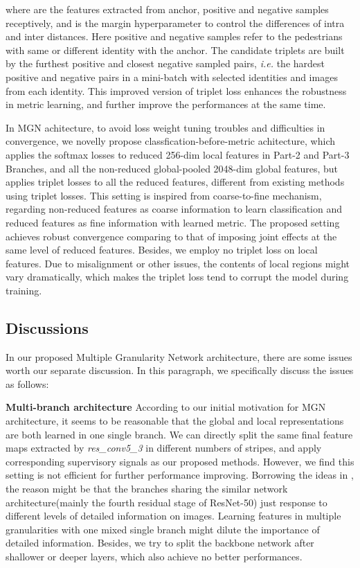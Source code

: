 \documentclass[sigconf]{acmart}
\begin{document}
where  are the features extracted from anchor, positive and negative samples receptively, and  is the margin hyperparameter to control the differences of intra and inter distances. Here positive and negative samples refer to the pedestrians with same or different identity with the anchor. The candidate triplets are built by the furthest positive and closest negative sampled pairs, \textit{i.e.} the hardest positive and negative pairs in a mini-batch with  selected identities and  images from each identity. This improved version of triplet loss enhances the robustness in metric learning, and further improve the performances at the same time.  

In MGN achitecture, to avoid loss weight tuning troubles and difficulties in convergence, we novelly propose classfication-before-metric achitecture, which applies the softmax losses to reduced 256-dim local features in Part-2 and Part-3 Branches, and all the non-reduced global-pooled 2048-dim global features, but applies triplet losses to all the reduced features, different from existing methods using triplet losses. This setting is inspired from coarse-to-fine mechanism, regarding non-reduced features as coarse information to learn classification and reduced features as fine information with learned metric. The proposed setting achieves robust convergence comparing to that of imposing joint effects at the same level of reduced features. Besides, we employ no triplet loss on local features. Due to misalignment or other issues, the contents of local regions might vary dramatically, which makes the triplet loss tend to corrupt the model during training.  


\subsection{Discussions}
In our proposed Multiple Granularity Network architecture, there are some issues worth our separate discussion. In this paragraph, we specifically discuss the issues as follows: 

\textbf{Multi-branch architecture} According to our initial motivation for MGN architecture, it seems to be reasonable that the global and local representations are both learned in one single branch. We can directly split the same final feature maps extracted by \textit{res\_conv5\_3} in different numbers of stripes, and apply corresponding supervisory signals as our proposed methods. However, we find this setting is not efficient for further performance improving. Borrowing the ideas in \cite{sun2014deeply}, the reason might be that the branches sharing the similar network architecture(mainly the fourth residual stage of ResNet-50) just response to different levels of detailed information on images. Learning features in multiple granularities with one mixed single branch might dilute the importance of detailed information. Besides, we try to split the backbone network after shallower or deeper layers, which also achieve no better performances. 
\end{document}
